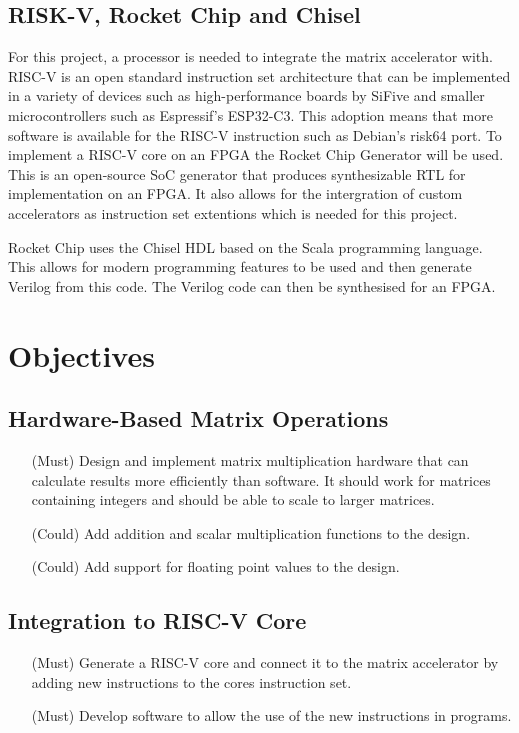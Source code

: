\documentclass[a4paper,fleqn,12pt]{article}
\begin{document}
	\subsection{RISK-V, Rocket Chip and Chisel}
	For this project, a processor is needed to integrate the matrix accelerator with. RISC-V is an open standard instruction set architecture that can be implemented in a variety of devices such as high-performance boards by SiFive and smaller microcontrollers such as Espressif's ESP32-C3. This adoption means that more software is available for the RISC-V instruction such as Debian's risk64 port. To implement a RISC-V core on an FPGA the Rocket Chip Generator will be used. This is an open-source SoC generator that produces synthesizable RTL for implementation on an FPGA. It also allows for the intergration of custom accelerators as instruction set extentions \citep{rocketchip} which is needed for this project.
	
	Rocket Chip uses the Chisel HDL based on the Scala programming language. This allows for modern programming features to be used and then generate Verilog from this code. The Verilog code can then be synthesised for an FPGA.
	
	\section{Objectives}
	\subsection{Hardware-Based Matrix Operations}
	\begin{enumerate}
		\item [(Must)]  Design and implement matrix multiplication hardware that can calculate results more efficiently than software. It should work for matrices containing integers and should be able to scale to larger matrices.
		\item [(Could)] Add addition and scalar multiplication functions to the design.
		\item [(Could)] Add support for floating point values to the design.
	\end{enumerate}
	\subsection{Integration to RISC-V Core}
	\begin{enumerate}
		\item [(Must)] Generate a RISC-V core and connect it to the matrix accelerator by adding new instructions to the cores instruction set.
		\item [(Must)] Develop software to allow the use of the new instructions in programs.
	\end{enumerate}
\end{document}
